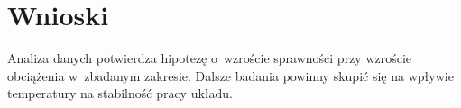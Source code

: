 \documentclass[11pt,a4paper,oneside]{article}
\begin{document}
\section{Wnioski}
Analiza danych potwierdza hipotezę o~wzroście sprawności przy wzroście obciążenia w~zbadanym zakresie. Dalsze badania powinny skupić się na wpływie temperatury na stabilność pracy układu.

\printbibliography
\end{document}
